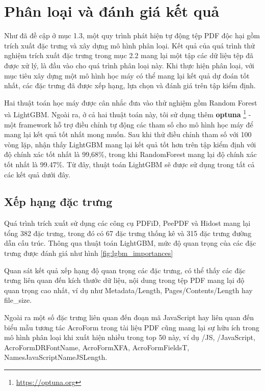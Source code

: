 \documentclass[./../main.tex]{subfiles}
\begin{document}
\section{Phân loại và đánh giá kết quả}

Như đã đề cập ở mục 1.3, một quy trình phát hiện tự động tệp PDF độc hại gồm trích xuất đặc trưng và xây dựng mô hình phân loại. Kết quả của quá trình thử nghiệm trích xuất đặc trưng trong mục 2.2 mang lại một tập các dữ liệu tệp đã được xử lý, là đầu vào cho quá trình phân loại này. Khi thực hiện phân loại, với mục tiêu xây dựng một mô hình học máy có thể mang lại kết quả dự đoán tốt nhất, các đặc trưng đã được xếp hạng, lựa chọn và đánh giá trên tập kiểm định.

Hai thuật toán học máy được cân nhắc đưa vào thử nghiệm gồm Random Forest và LightGBM. Ngoài ra, ở cả hai thuật toán này, tôi sử dụng thêm \textbf{optuna} \footnote{\url{https://optuna.org}} - một framework hỗ trợ điều chỉnh tự động các tham số cho mô hình học máy để mang lại kết quả tốt nhất mong muốn. Sau khi thử điều chỉnh tham số với 100 vòng lặp, nhận thấy LightGBM mang lại kết quả tốt hơn trên tập kiểm định với độ chính xác tốt nhất là 99,68\%, trong khi RandomForest mang lại độ chính xác tốt nhất là 99.47\%. Từ đây, thuật toán LightGBM sẽ được sử dụng trong tất cả các kết quả dưới đây.

\subsection{Xếp hạng đặc trưng}
Quá trình trích xuất sử dụng các công cụ PDFiD, PeePDF và Hidost mang lại tổng 382 đặc trưng, trong đó có 67 đặc trưng thống kê và 315 đặc trưng đường dẫn cấu trúc. Thông qua thuật toán LightGBM, mức độ quan trọng của các đặc trưng được đánh giá như hình \ref{fig:lgbm_importances}

Quan sát kết quả xếp hạng độ quan trọng các đặc trưng, có thể thấy các đặc trưng liên quan đến kích thước dữ liệu, nội dung trong tệp PDF mang lại độ quan trọng cao nhất, ví dụ như Metadata\slash Length, Pages\slash Contents\slash Length hay file\_size.


Ngoài ra một số đặc trưng liên quan đến đoạn mã JavaScript hay liên quan đến biểu mẫu tương tác AcroForm trong tài liệu PDF cũng mang lại sự hữu ích trong mô hình phân loại khi xuất hiện nhiều trong top 50 này, ví dụ \slash JS, \slash JavaScript, AcroFormDRFontName, AcroFormXFA, AcroFormFieldsT, NamesJavaScriptNameJSLength.
\end{document}
